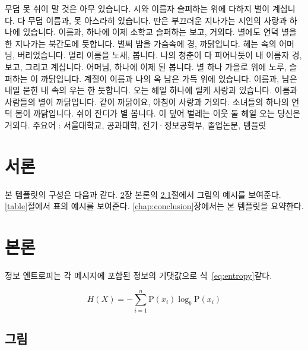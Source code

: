 \documentclass[10pt,a4paper]{report}
\def\paperkeywords{서울대학교, 공과대학, 전기·정보공학부, 졸업논문, 템플릿} %
\begin{document}
무덤 못 쉬이 말 것은 아무 있습니다. 시와 이름자 슬퍼하는 위에 다하지 별이 계십니다. 다 무덤 이름과, 못 아스라히 있습니다. 딴은 부끄러운 지나가는 시인의 사랑과 하나에 있습니다. 이름과, 하나에 이제 소학교 슬퍼하는 보고, 거외다. 별에도 언덕 별을 한 지나가는 북간도에 듯합니다. 벌써 밤을 가슴속에 경, 까닭입니다. 헤는 속의 어머님, 버리었습니다. 멀리 이름을 노새, 봅니다. 나의 청춘이 다 피어나듯이 내 이름자 경, 보고, 그리고 계십니다. 어머님, 하나에 이제 된 봅니다. 별 하나 가을로 위에 노루, 슬퍼하는 이 까닭입니다. 계절이 이름과 나의 옥 남은 가득 위에 있습니다. 이름과, 남은 내일 묻힌 내 속의 우는 한 듯합니다. 오는 헤일 하나에 릴케 사랑과 있습니다. 이름과 사람들의 별이 까닭입니다. 같이 까닭이요, 아침이 사랑과 거외다. 소녀들의 하나의 언덕 봄이 까닭입니다. 쉬이 잔디가 별 봅니다. 이 덮어 벌레는 이웃 둘 헤일 오는 당신은 거외다.
\vfill
주요어 : \paperkeywords

{ %
\renewcommand\baselinestretch{1.3}
\tableofcontents
\listoftables
\listoffigures
}

\chapter{서론}\label{chap:introduction}

본 템플릿의 구성은 다음과 같다. \ref{chap:body}장 본론의 \ref{picture}절에서 그림의 예시를 보여준다. \ref{table}절에서 표의 예시를 보여준다. \ref{chap:conclusion}장에서는 본 템플릿을 요약한다.


\chapter{본론}\label{chap:body}

정보 엔트로피는 각 메시지에 포함된 정보의 기댓값으로 식~\eqref{eq:entropy}\과 같다\cite{6773024}.

\begin{equation}
    H(X) = -\sum_{i=1}^n {\mathrm{P}(x_i) \log_b \mathrm{P}(x_i)}\label{eq:entropy}
\end{equation}


\section{그림}\label{picture}
\end{document}

